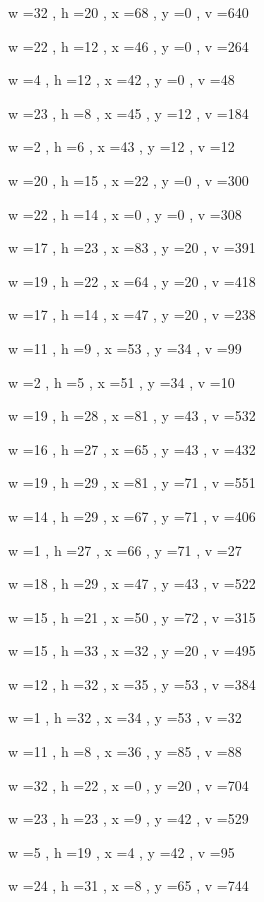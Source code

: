 \documentclass[11pt]{article}
\begin{document}
w =32 , h =20 , x =68 , y =0 , v =640
\par
w =22 , h =12 , x =46 , y =0 , v =264
\par
w =4 , h =12 , x =42 , y =0 , v =48
\par
w =23 , h =8 , x =45 , y =12 , v =184
\par
w =2 , h =6 , x =43 , y =12 , v =12
\par
w =20 , h =15 , x =22 , y =0 , v =300
\par
w =22 , h =14 , x =0 , y =0 , v =308
\par
w =17 , h =23 , x =83 , y =20 , v =391
\par
w =19 , h =22 , x =64 , y =20 , v =418
\par
w =17 , h =14 , x =47 , y =20 , v =238
\par
w =11 , h =9 , x =53 , y =34 , v =99
\par
w =2 , h =5 , x =51 , y =34 , v =10
\par
w =19 , h =28 , x =81 , y =43 , v =532
\par
w =16 , h =27 , x =65 , y =43 , v =432
\par
w =19 , h =29 , x =81 , y =71 , v =551
\par
w =14 , h =29 , x =67 , y =71 , v =406
\par
w =1 , h =27 , x =66 , y =71 , v =27
\par
w =18 , h =29 , x =47 , y =43 , v =522
\par
w =15 , h =21 , x =50 , y =72 , v =315
\par
w =15 , h =33 , x =32 , y =20 , v =495
\par
w =12 , h =32 , x =35 , y =53 , v =384
\par
w =1 , h =32 , x =34 , y =53 , v =32
\par
w =11 , h =8 , x =36 , y =85 , v =88
\par
w =32 , h =22 , x =0 , y =20 , v =704
\par
w =23 , h =23 , x =9 , y =42 , v =529
\par
w =5 , h =19 , x =4 , y =42 , v =95
\par
w =24 , h =31 , x =8 , y =65 , v =744
\par
\newpage


\end{document}
